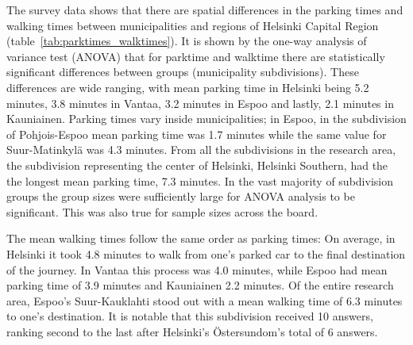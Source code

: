 The survey data shows that there are spatial differences in the parking times and walking times between municipalities and regions of Helsinki Capital Region (table~\ref{tab:parktimes_walktimes}). It is shown by the one-way analysis of variance test (ANOVA) that for parktime and walktime there are statistically significant differences between groups (municipality subdivisions). These differences are wide ranging, with mean parking time in Helsinki being 5.2 minutes, 3.8 minutes in Vantaa, 3.2 minutes in Espoo and lastly, 2.1 minutes in Kauniainen. Parking times vary inside municipalities; in Espoo, in the subdivision of Pohjois-Espoo mean parking time was 1.7 minutes while the same value for Suur-Matinkylä was 4.3 minutes. From all the subdivisions in the research area, the subdivision representing the center of Helsinki, Helsinki Southern, had the the longest mean parking time, 7.3 minutes. In the vast majority of subdivision groups the group sizes were sufficiently large for ANOVA analysis to be significant. This was also true for sample sizes across the board.

The mean walking times follow the same order as parking times: On average, in Helsinki it took 4.8 minutes to walk from one's parked car to the final destination of the journey. In Vantaa this process was 4.0 minutes, while Espoo had mean parking time of 3.9 minutes and Kauniainen 2.2 minutes. Of the entire research area, Espoo's Suur-Kauklahti stood out with a mean walking time of 6.3 minutes to one's destination. It is notable that this subdivision received 10 answers, ranking second to the last after Helsinki's Östersundom's total of 6 answers.



